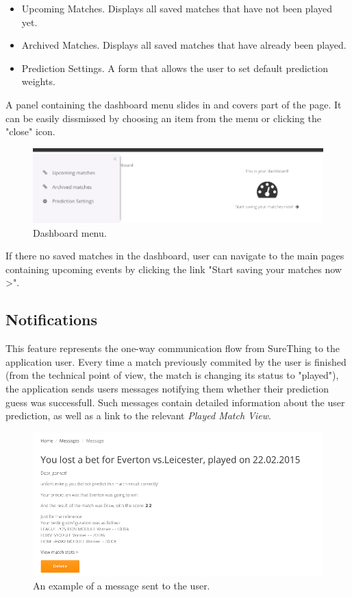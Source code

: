 \begin{itemize}
	\item{Upcoming Matches. Displays all saved matches that have not been played yet. }
	\item{Archived Matches. Displays all saved matches that have already been played.}
	\item{Prediction Settings. A form that allows the user to set default prediction weights.}
\end{itemize}

A panel containing the dashboard menu slides in and covers part of the page. It can be easily dissmissed by choosing an item from the menu or clicking the "close" icon.

\begin{figure}[H]
	\begin{center}
		\includegraphics[width=.90\textwidth]{impl/images/dashboardMenu}
		\caption{Dashboard menu.} \label{fig:using: dashboardmenu}
	\end{center}
\end{figure}

If there no saved matches in the dashboard, user can navigate to the main pages containing upcoming events by clicking the link "Start saving your matches now >".

\subsection{Notifications}
\label{subsec:notifications}
This feature represents the one-way communication flow from SureThing to the application user. Every time a match previously commited by the user is finished (from the technical point of view, the match is changing its status to "played"), the application sends users messages notifying them whether their prediction guess was successfull. Such messages contain detailed information about the user prediction, as well as a link to the relevant \emph{Played Match View}.

\begin{figure}[H]
	\begin{center}
		\includegraphics[width=.90\textwidth]{impl/images/message}
		\caption{An example of a message sent to the user.} \label{fig:using: message}
	\end{center}
\end{figure}

